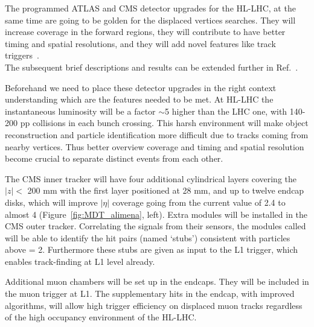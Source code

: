 The programmed ATLAS and CMS detector upgrades for the HL-LHC, at the
same time are going to be golden for the displaced vertices
searches. They will increase coverage in the forward regions, they
will contribute to have better timing and spatial resolutions, and
they will add novel features like track
triggers~\cite{Alimena_2020}.\\
The subsequent brief descriptions and results can be extended further
in
Ref.~\cite{CERN-LHCC-2017-009,CERN-LHCC-2017-011,CERN-LHCC-2017-012,CERN-LHCC-2017-027,CERN-LHCC-2017-013}.

Beforehand we need to place these detector upgrades in the right context
understanding which are the features needed to be met. At HL-LHC the
instantaneous luminosity will be a factor $\sim$5 higher than the LHC
one, with 140-200 pp collisions in each bunch crossing. This harsh
environment will make object reconstruction and particle
identification more difficult due to tracks coming from nearby
vertices. Thus better overview coverage and timing and spatial
resolution become crucial to
separate distinct events from each other. 


The CMS inner tracker will have four additional cylindrical 
layers covering the $|z| < $ 200 mm with the first layer positioned at
28 mm, and up to twelve endcap
disks, which will improve $|\eta|$ coverage going from the current
value of 2.4 to almost 4 (Figure~\ref{fig:MDT_alimena}, left).
Extra modules will be installed in
the CMS outer tracker. Correlating the signals from their sensors, the modules called \pt will be able to identify
the hit pairs (named ‘stubs’) consistent with particles above \pt =
2\GeV. Furthermore these stubs are given as input to the L1 trigger, which enables track-finding
at L1 level already. 

Additional muon chambers will be set up in the endcaps. They will be included in
the muon trigger at L1. The supplementary hits in the
endcap, with improved algorithms, will allow high trigger efficiency 
on displaced muon tracks regardless of the high occupancy environment of the HL-LHC.
 

